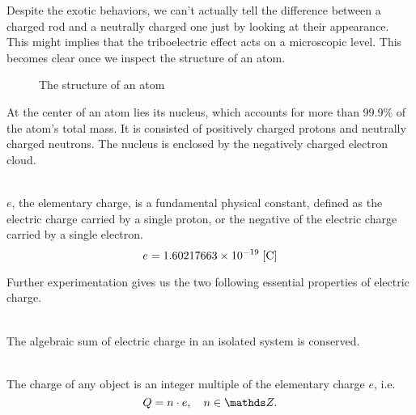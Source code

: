 Despite the exotic behaviors, we can't actually tell the difference between a charged rod and a neutrally charged one just by looking at their appearance. This might implies that the triboelectric effect acts on a microscopic level. This becomes clear once we inspect the structure of an atom.\par
\begin{figure}[htbp]
    \centering
    
    \caption{The structure of an atom}
\end{figure}
At the center of an atom lies its nucleus, which accounts for more than $99.9\%$ of the atom's total mass. It is consisted of positively charged protons and neutrally charged neutrons. The nucleus is enclosed by the negatively charged electron cloud.
\begin{definition}
    \ \\$e$, the elementary charge, is a fundamental physical constant, defined as the electric charge carried by a single proton, or the negative of the electric charge carried by a single electron.
    $$e=1.60217663 \times 10^{-19}\;[\rm{C}]$$
\end{definition}
Further experimentation gives us the two following essential properties of electric charge.
\begin{property}
    \ \\The algebraic sum of electric charge in an isolated system is conserved.
\end{property}
\begin{property}
    \ \\The charge of any object is an integer multiple of the elementary charge $e$, i.e.
    $$Q=n\cdot e,\quad n\in\Z.$$
\end{property}
